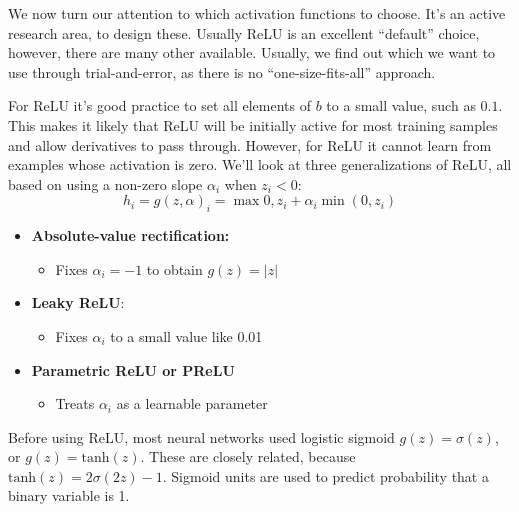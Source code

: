 We now turn our attention to which activation functions to choose. It's an active research area, to design these. Usually ReLU is an excellent ``default'' choice, however, there are many other available. Usually, we find out which we want to use through trial-and-error, as there is no ``one-size-fits-all'' approach.

For ReLU it's good practice to set all elements of $b$ to a small value, such as $0.1$. This makes it likely that ReLU will be initially active for most training samples and allow derivatives to pass through. However, for ReLU it cannot learn from examples whose activation is zero. We'll look at three generalizations of ReLU, all based on using a non-zero slope $\alpha_{i}$ when $z_{i} < 0$:
\begin{equation*}
	h_{i} = g(z,\alpha)_{i} = \max{0,z_{i}} + \alpha_{i}\min(0,z_{i})
\end{equation*}
\begin{itemize}
	\item \textbf{Absolute-value rectification:}
	      \begin{itemize}
		      \item Fixes $\alpha_{i} = -1$ to obtain $g(z) = |z|$
	      \end{itemize}

	\item \textbf{Leaky ReLU}:
	      \begin{itemize}
		      \item Fixes \(\alpha_{i}\) to a small value like 0.01
	      \end{itemize}
	\item \textbf{Parametric ReLU or PReLU}
	      \begin{itemize}
		      \item Treats \(\alpha_{i}\) as a learnable parameter
	      \end{itemize}
\end{itemize}

Before using ReLU, most neural networks used logistic sigmoid \(g(z) = \sigma(z)\), or $g(z) = \text{tanh}(z)$. These are closely related, because $\text{tanh}(z) = 2\sigma(2z)-1$. Sigmoid units are used to predict probability that a binary variable is 1.

